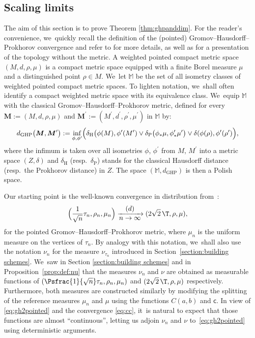 \subsection{Scaling limits}\label{sec:scalinglimitproof}
The aim of this section is to prove Theorem \ref{thm:ghpanddim}. For the reader's convenience, we~quickly recall the definition of the (pointed) Gromov--Hausdorff--Prokhorov convergence and refer to \cite{MR3035742,khezeli2020metrization} for more details, as well as \cite{AthreayLorWinter} for a presentation of the topology without the metric. A weighted pointed compact metric space $(M,d,\rho,\mu)$ is a compact metric space equipped with a finite Borel measure $\mu$ and a distinguished point $\rho\in M$. We~let $\mathbb{M}$ be the set of all isometry classes of weighted pointed compact metric spaces. To lighten notation, we~shall often identify a compact weighted metric space with its equivalence class. We~equip $\mathbb{M}$ with the classical Gromov--Hausdorff--Prokhorov metric, defined for every $\boldsymbol{M}:=(M,d, \rho,\mu)$ and $\boldsymbol{M}^{\prime}:=(M^{\prime},d^{{\prime}},\rho^\prime,\mu^{\prime})$ in $\mathbb{M}$ by:
\[
d_{\mathrm{GHP}}\big(\boldsymbol{M},\boldsymbol{M}^{\prime}\big):=\inf\limits_{\phi,\phi^{\prime}}\Bigl(\delta_{\text{H}}\big(\phi(M),\phi^{\prime}(M^{\prime})\vee \delta_{\text{P}}\big(\phi_* \mu,\phi^{\prime}_* \mu^{\prime}\big)\vee \delta(\phi(\rho),\phi^\prime(\rho^\prime)\Bigr),
\]
where the infimum is taken over all isometries $\phi$, $\phi^{\prime}$ from $M$, $M^{\prime}$ into a metric space $(Z, \delta)$ and $\delta_{\text{H}}$ (resp.~$\delta_{\text{P}}$) stands for the classical Hausdorff distance (resp.~the Prokhorov distance) in $Z$. The space $(\mathbb{M},d_{\mathrm{GHP}})$ is then a Polish space.

Our starting point is the well-known convergence in distribution from~\cite{Ald93}:
\begin{equation}\label{eq:gh2pointed} \Bigl(\frac{1}{\sqrt{n}}\tau_n,\rho_n,\mu_n \Bigr) \xrightarrow[\textstyle n\to\infty]{\textstyle(d)} (2\sqrt{2}\,\T,\rho,\mu),
\end{equation}
for the pointed Gromov--Hausdorff--Prokhorov metric, where $\mu_n$ is the uniform measure on the vertices of $\tau_n$. By analogy with this notation, we~shall also use the notation $\nu_n$ for the measure $\nu_{\tau_n}$ introduced in Section~\ref{section:building schemes}. We~saw in Section \ref{section:building schemes} and in Proposition~\ref{prop:def:nu} that the measures $\nu_n$ and $\nu$ are obtained as measurable functions of $(\Psfrac{1}{\sqrt{n}}\tau_n,\rho_n,\mu_n)$ and $(2\sqrt{2}\,\T,\rho,\mu)$ respectively. Furthermore, both measures are constructed similarly by modifying the splitting of the reference measures $\mu_n$ and $\mu$ using the functions $C(a,b)$ and $ \mathsf{c}$. In view of \eqref{eq:gh2pointed} and the convergence \eqref{eq:cc}, it~is natural to expect that those functions are almost ``continuous'', letting us adjoin $\nu_n$ and $\nu$ to~\eqref{eq:gh2pointed} using deterministic arguments.

